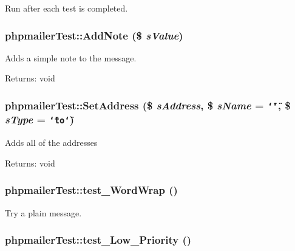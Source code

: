 Run after each test is completed. \hypertarget{classphpmailerTest_46261f975013e4c661063c79ba60b538}{
\subsubsection[AddNote]{\setlength{\rightskip}{0pt plus 5cm}phpmailerTest::AddNote (\$ {\em sValue})}}
\label{classphpmailerTest_46261f975013e4c661063c79ba60b538}


Adds a simple note to the message.

\begin{Desc}
\item[Returns:]void \end{Desc}
\hypertarget{classphpmailerTest_494e608fad377334ecbdd5f0b49eb094}{
\subsubsection[SetAddress]{\setlength{\rightskip}{0pt plus 5cm}phpmailerTest::SetAddress (\$ {\em sAddress}, \/  \$ {\em sName} = {\tt \char`\"{}\char`\"{}}, \/  \$ {\em sType} = {\tt \char`\"{}to\char`\"{}})}}
\label{classphpmailerTest_494e608fad377334ecbdd5f0b49eb094}


Adds all of the addresses

\begin{Desc}
\item[Returns:]void \end{Desc}
\hypertarget{classphpmailerTest_3d736d9ad00be8d68d18c02a23ab6be2}{
\subsubsection[test\_\-WordWrap]{\setlength{\rightskip}{0pt plus 5cm}phpmailerTest::test\_\-WordWrap ()}}
\label{classphpmailerTest_3d736d9ad00be8d68d18c02a23ab6be2}


Try a plain message. \hypertarget{classphpmailerTest_a2e3da7cf253b35a14e8ae83b88c13fd}{
\subsubsection[test\_\-Low\_\-Priority]{\setlength{\rightskip}{0pt plus 5cm}phpmailerTest::test\_\-Low\_\-Priority ()}}
\label{classphpmailerTest_a2e3da7cf253b35a14e8ae83b88c13fd}


